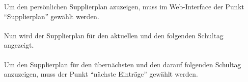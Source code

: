  Um den persönlichen Supplierplan azuzeigen, muss im Web-Interface der Punkt \enquote{Supplierplan} gewählt werden.
 \\
 \\
 Nun wird der Supplierplan für den aktuellen und den folgenden Schultag angezeigt.
 \\
 \\
 Um den Supplierplan für den übernächsten und den darauf folgenden Schultag anzuzeigen, muss der Punkt \enquote{nächste Einträge} gewählt werden.
